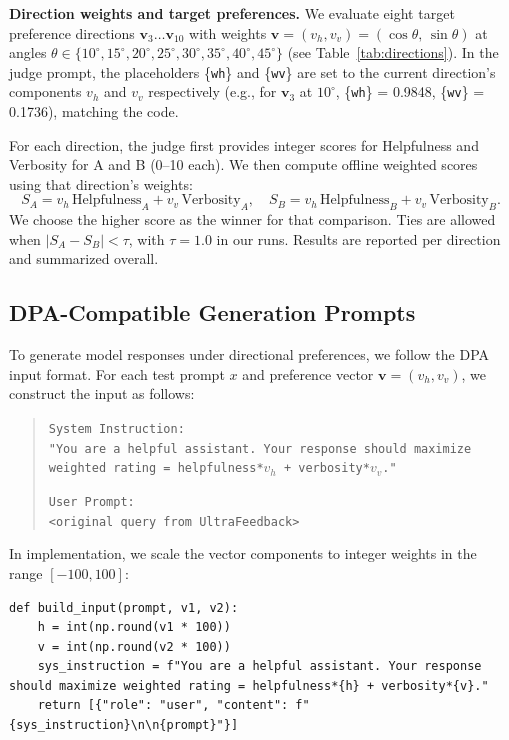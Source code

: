 \documentclass{article} %
\begin{document}
\noindent\textbf{Direction weights and target preferences.} We evaluate eight target preference directions \(\mathbf{v}_3 \ldots \mathbf{v}_{10}\) with weights \(\mathbf{v}=(v_h, v_v)=(\cos\theta,\,\sin\theta)\) at angles \(\theta \in \{10^\circ,15^\circ,20^\circ,25^\circ,30^\circ,35^\circ,40^\circ,45^\circ\}\) (see Table~\ref{tab:directions}). In the judge prompt, the placeholders \{\texttt{wh}\} and \{\texttt{wv}\} are set to the current direction's components \(v_h\) and \(v_v\) respectively (e.g., for \(\mathbf{v}_3\) at \(10^\circ\), \{\texttt{wh}\} = 0.9848, \{\texttt{wv}\} = 0.1736), matching the code.

For each direction, the judge first provides integer scores for Helpfulness and Verbosity for A and B (0--10 each). We then compute offline weighted scores using that direction's weights:
\[
S_A = v_h\,\text{Helpfulness}_A + v_v\,\text{Verbosity}_A,\quad
S_B = v_h\,\text{Helpfulness}_B + v_v\,\text{Verbosity}_B.
\]
We choose the higher score as the winner for that comparison. Ties are allowed when \(|S_A - S_B| < \tau\), with \(\tau=1.0\) in our runs. Results are reported per direction and summarized overall.
\endgroup

\subsection{DPA-Compatible Generation Prompts}

To generate model responses under directional preferences, we follow the DPA input format. For each test prompt $x$ and preference vector $\mathbf{v} = (v_h, v_v)$, we construct the input as follows:

\begin{quote}
\texttt{System Instruction:} \\
\texttt{"You are a helpful assistant. Your response should maximize weighted rating = helpfulness*$v_h$ + verbosity*$v_v$."}

\texttt{User Prompt:} \\
\texttt{<original query from UltraFeedback>}
\end{quote}

In implementation, we scale the vector components to integer weights in the range $[-100, 100]$:

\begin{verbatim}
def build_input(prompt, v1, v2):
    h = int(np.round(v1 * 100))
    v = int(np.round(v2 * 100))
    sys_instruction = f"You are a helpful assistant. Your response should maximize weighted rating = helpfulness*{h} + verbosity*{v}."
    return [{"role": "user", "content": f"{sys_instruction}\n\n{prompt}"}]
\end{verbatim}
\end{document}
